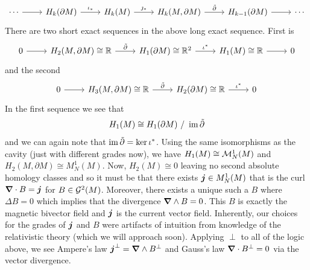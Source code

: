 \documentclass{article}
\begin{document}
\[
\begin{tikzcd}
\cdots \arrow[r] & H_k(\partial M) \arrow[r, "\iota_*"] & H_k(M) \arrow[r, "\jmath_*"] & {H_k(M,\partial M)} \arrow[r, "\tilde{\partial}"] & H_{k-1}(\partial M) \arrow[r] & \cdots
\end{tikzcd}
\]
There are two short exact sequences in the above long exact sequence. First is 
\[
\begin{tikzcd}
0 \arrow[r] & {H_2(M,\partial M)\cong \mathbb{R}} \arrow[r, "\tilde{\partial}"] & H_1(\partial M)\cong \mathbb{R}^2 \arrow[r, "\iota^*"] & H_1(M)\cong \mathbb{R} \arrow[r] & {0}
\end{tikzcd}
\]
and the second
\[
\begin{tikzcd}
0 \arrow[r] & {H_3(M,\partial M)\cong \mathbb{R}} \arrow[r, "\tilde{\partial}"] & H_2(\partial M)\cong \mathbb{R} \arrow[r, "\iota^*"] & {0}
\end{tikzcd}
\]
In the first sequence we see that
\[
H_1(M) \cong H_1(\partial M) ~/~ \operatorname{im} \tilde{\partial}
\]
and we can again note that $\operatorname{im} \tilde{\partial} = \ker \iota^*$. Using the same isomorphisms as the cavity (just with different grades now), we have $H_1(M)\cong \mathcal{M}^1_N(M)$ and $H_2(M,\partial M) \cong M^1_N(M)$. Now, $H_2(M)\cong 0$ leaving no second absolute homology classes and so it must be that there exists $\boldsymbol{j} \in M^1_N(M)$ that is the curl $\boldsymbol{\nabla} \cdot B =\boldsymbol{j}$ for $B\in \mathcal{G}^2(M)$. Moreover, there exists a unique such a $B$ where $\Delta B=0$ which implies that the divergence $\boldsymbol{\nabla} \wedge B = 0$. This $B$ is exactly the magnetic bivector field and $\boldsymbol{j}$ is the current vector field. Inherently, our choices for the grades of $\boldsymbol{j}$ and $B$ were artifacts of intuition from knowledge of the relativistic theory (which we will approach soon). Applying $\perp$ to all of the logic above, we see Ampere's law $\boldsymbol{j}^\perp = \boldsymbol{\nabla} \wedge B^\perp$ and Gauss's law $\boldsymbol{\nabla} \cdot B^\perp = 0$ via the vector divergence. 
\end{document}
